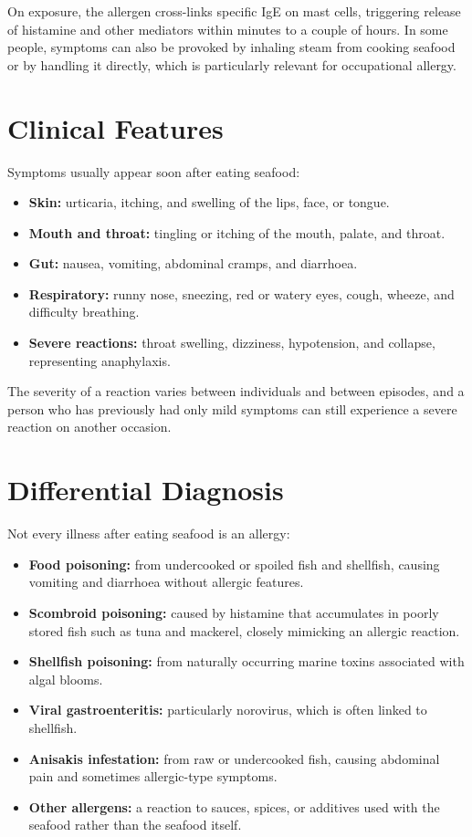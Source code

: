 On exposure, the allergen cross-links specific IgE on mast cells, triggering release of histamine and other mediators within minutes to a couple of hours. In some people, symptoms can also be provoked by inhaling steam from cooking seafood or by handling it directly, which is particularly relevant for occupational allergy.

\section*{Clinical Features}
Symptoms usually appear soon after eating seafood:

\begin{itemize}
    \item \textbf{Skin:} urticaria, itching, and swelling of the lips, face, or tongue.
    \item \textbf{Mouth and throat:} tingling or itching of the mouth, palate, and throat.
    \item \textbf{Gut:} nausea, vomiting, abdominal cramps, and diarrhoea.
    \item \textbf{Respiratory:} runny nose, sneezing, red or watery eyes, cough, wheeze, and difficulty breathing.
    \item \textbf{Severe reactions:} throat swelling, dizziness, hypotension, and collapse, representing anaphylaxis.
\end{itemize}

The severity of a reaction varies between individuals and between episodes, and a person who has previously had only mild symptoms can still experience a severe reaction on another occasion.

\section*{Differential Diagnosis}
Not every illness after eating seafood is an allergy:

\begin{itemize}
    \item \textbf{Food poisoning:} from undercooked or spoiled fish and shellfish, causing vomiting and diarrhoea without allergic features.
    \item \textbf{Scombroid poisoning:} caused by histamine that accumulates in poorly stored fish such as tuna and mackerel, closely mimicking an allergic reaction.
    \item \textbf{Shellfish poisoning:} from naturally occurring marine toxins associated with algal blooms.
    \item \textbf{Viral gastroenteritis:} particularly norovirus, which is often linked to shellfish.
    \item \textbf{Anisakis infestation:} from raw or undercooked fish, causing abdominal pain and sometimes allergic-type symptoms.
    \item \textbf{Other allergens:} a reaction to sauces, spices, or additives used with the seafood rather than the seafood itself.
\end{itemize}

